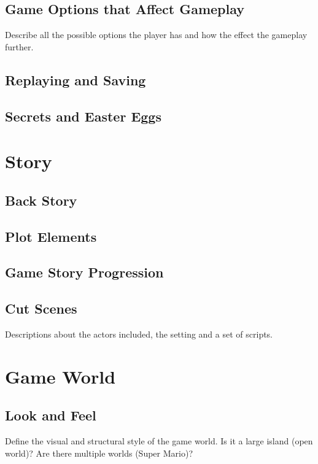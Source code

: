 \documentclass[12pt]{article}
\begin{document}
\subsection{Game Options that Affect Gameplay}

Describe all the possible options the player has and how the effect the gameplay further. 

\subsection{Replaying and Saving}

\subsection{Secrets and Easter Eggs}

\section{Story}

\subsection{Back Story}

\subsection{Plot Elements}

\subsection{Game Story Progression}

\subsection{Cut Scenes}

Descriptions about the actors included, the setting and a set of scripts.

\section{Game World}

\subsection{Look and Feel}

Define the visual and structural style of the game world. Is it a large island (open world)? Are there multiple worlds (Super Mario)?
\end{document}
